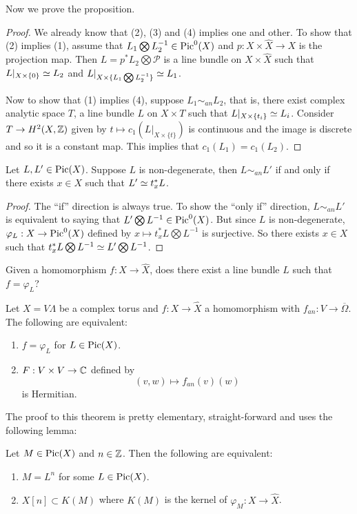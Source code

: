 Now we prove the proposition.

\begin{proof}
We already know that (2), (3) and (4) implies one and other. To show that (2) implies (1), assume that $L_1\bigotimes L_2^{-1} \in \operatorname{Pic}^0(X)$ and $p:X\times \hat{X}\to X$ is the projection map. Then $L=p^* L_2\bigotimes \mathcal{P}$ is a line bundle on $X\times \hat{X}$ such that 
$L|_{X\times \{0\}}\simeq L_2$ and $L|_{X\times \{L_1\bigotimes L_2^{-1}\}}\simeq L_1$. 

Now to show that (1) implies (4), suppose $L_1\sim_{an} L_2$, that is, there exist complex analytic space $T$, a line bundle $L$ on $X\times T$ such that $L|_{X\times \{t_i\}}\simeq L_i$. Consider $T\to H^2(X,{\mathbb Z})$ given by $t\mapsto c_1(L|_{X\times \{t\}})$ is continuous and the image is discrete and so it is a constant map. This implies that $c_1(L_1)=c_1(L_2)$. 

\end{proof}


\begin{lemma}
Let $L,L'\in \operatorname{Pic}(X)$. Suppose $L$ is non-degenerate, then $L\sim_{an} L'$ if and only if there exists $x\in X$ such that $L'\simeq t_x^* L$. 
\end{lemma}

\begin{proof}
The ``if'' direction is always true. To show the ``only if'' direction, $L\sim_{an} L'$ is equivalent to saying that $L'\bigotimes L^{-1}\in \operatorname{Pic}^0(X)$. But since $L$ is non-degenerate, $\varphi_L:X\to \operatorname{Pic}^0(X)$ defined by $x\mapsto t_x^*L\bigotimes L^{-1}$ is surjective. So there exists $x\in X$ such that $t_x^*L \bigotimes L^{-1}\simeq L'\bigotimes L^{-1}$. 
\end{proof}

Given a homomorphism $f:X\to \hat{X}$, does there exist a line bundle $L$ such that $f=\varphi_L$?

\begin{theorem}
Let $X=V\Lambda$ be a complex torus and $f:X\to \hat{X}$ a homomorphism with $f_{an}:V\to \overline{\Omega}$. The following are equivalent:
\begin{enumerate}
\item $f=\varphi_L$ for $L\in \operatorname{Pic}(X)$.
\item $F:V\times V\to {\mathbb C}$ defined by 
$$(v,w)\mapsto f_{an}(v)(w)$$
is Hermitian.
\end{enumerate}
\end{theorem}

The proof to this theorem is pretty elementary, straight-forward and uses the following lemma:
\begin{lemma}
Let $M\in \operatorname{Pic}(X)$ and $n\in {\mathbb Z}$. Then the following are equivalent:
\begin{enumerate}
\item $M=L^n$ for some $L\in \operatorname{Pic}(X)$.
\item $X[n]\subset K(M)$ where $K(M)$ is the kernel of $\varphi_M:X\to \hat{X}$. 
\end{enumerate}

\end{lemma}

